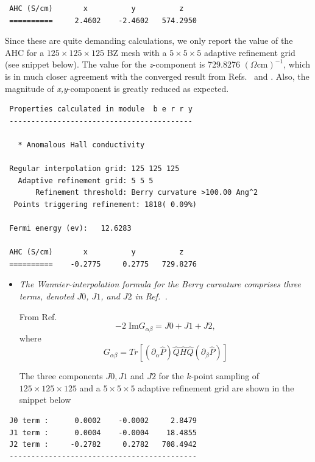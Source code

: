 \begin{itemize}
\begin{tcolorbox}[title=With adaptive refinement,sharp corners,boxrule=0.5pt]
{\begin{verbatim}
 AHC (S/cm)       x          y          z
 ==========     2.4602    -2.4602   574.2950
\end{verbatim}
}
\end{tcolorbox}

Since these are quite demanding calculations, we only report the value of the AHC for a $125\times125\times125$ BZ mesh with a $5\times5\times5$ adaptive refinement grid (see snippet below). The value for the \textit{z}-component is 729.8276 $(\Omega \mathrm{cm})^{-1}$, which is in much closer agreement with the converged result from Refs.~ and . Also, the magnitude of \textit{x,y}-component is greatly reduced as expected.

\begin{tcolorbox}[title={$125\times125\times125$ BZ mesh with a $5\times5\times5$ adaptive refinement grid}]
{\small
\begin{verbatim}
 Properties calculated in module  b e r r y
 ------------------------------------------

   * Anomalous Hall conductivity

 Regular interpolation grid: 125 125 125
   Adaptive refinement grid: 5 5 5
       Refinement threshold: Berry curvature >100.00 Ang^2
  Points triggering refinement: 1818( 0.09%)

 Fermi energy (ev):   12.6283

 AHC (S/cm)       x          y          z
 ==========    -0.2775     0.2775   729.8276
\end{verbatim}
}
\end{tcolorbox}
\end{itemize}

\begin{itemize}
	\item {\it The Wannier-interpolation formula for the Berry curvature comprises three terms, denoted $J0$, $J1$, and $J2$ in Ref.~.}

From Ref.~
\begin{equation}
-2\;\mathrm{Im} G_{\alpha\beta} = J0 + J1 + J2,
\end{equation}
where
\begin{equation}
G_{\alpha\beta} = Tr[(\partial_\alpha \hat{P})\hat{Q}\hat{H}\hat{Q}(\partial_\beta\hat{P})]
\end{equation}

The three components $J0, J1$ and $J2$ for the $k$-point sampling of $125\times125\times125$ and a $5\times5\times5$ adaptive refinement grid are shown in the snippet below
\end{itemize}
\begin{tcolorbox}[sharp corners,boxrule=0.5pt]
{\small
\begin{verbatim}
 J0 term :      0.0002    -0.0002     2.8479
 J1 term :      0.0004    -0.0004    18.4855
 J2 term :     -0.2782     0.2782   708.4942
 -------------------------------------------
\end{verbatim}
}
\end{tcolorbox}

